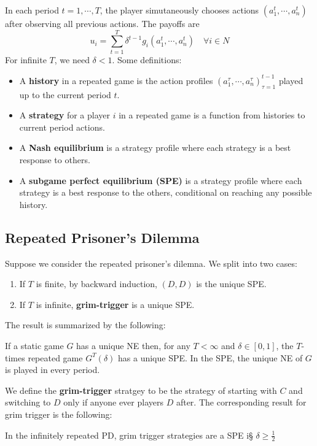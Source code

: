 \documentclass[9pt]{article}
\begin{document}
\begin{multicols}{2}
In each period $t=1,\cdots,T$, the player simutaneously chooses actions
$(a_1^{t},\cdots,a_{n}^{t})$ after observing all previous actions. The
payoffs are 
\begin{equation}
    u_i = \sum_{t=1}^{T}\delta^{t-1}g_i(a_1^{t},\cdots,a_{n}^{t}) \quad
    \forall i \in N
\end{equation}
For infinite $T$, we need $\delta < 1$. Some definitions:
\begin{itemize}
    \item A \textbf{history} in a repeated game is the action profiles
    $(a_1^{\tau},\cdots,a_{n}^{\tau})_{\tau = 1}^{t-1}$ played up to the
    current period $t$. 
    \item A \textbf{strategy} for a player $i$ in a repeated game is
    a function from histories to current period actions. 
    \item A \textbf{Nash equilibrium} is a strategy profile where each strategy is a best response to others.
    \item A \textbf{subgame perfect equilibrium (SPE)} is a strategy
    profile where each strategy is a best response to the others, conditional on reaching any possible history.
\end{itemize}

\subsection{Repeated Prisoner's Dilemma}

Suppose we consider the repeated prisoner's dilemna. We split into two cases: 
\begin{enumerate}[label=\roman*.]
    \item If $T$ is finite, by backward induction, $(D,D)$ is the unique SPE.
    \item If $T$ is infinite, \textbf{grim-trigger} is a unique SPE.
\end{enumerate}
The result is summarized by the following:
\begin{theorem}
    If a static game $G$ has a unique NE then, for any $ T < \infty$ and $\delta \in [0, 1]$, the $T$-times repeated game $G^T(\delta)$ has a unique SPE. In the SPE, the unique NE of $G$ is played in every period.
\end{theorem}
We define the \textbf{grim-trigger} stratgey to be the strategy of 
starting with $C$ and switching to $D$ only if anyone ever players $D$
after. The corresponding result for grim trigger is the following:
\begin{theorem}
    In the infinitely repeated PD, grim trigger strategies are a SPE i§  $\delta \ge \frac{1}{2}$
\end{theorem}


\end{multicols}
\end{document}
